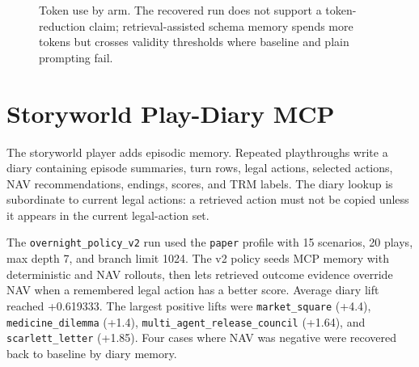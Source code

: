 \documentclass[11pt]{article}
\begin{document}
\begin{figure}[t]
\centering
{}
\caption{Token use by arm. The recovered run does not support a token-reduction claim; retrieval-assisted schema memory spends more tokens but crosses validity thresholds where baseline and plain prompting fail.}
\label{fig:tokens}
\end{figure}

\section{Storyworld Play-Diary MCP}

The storyworld player adds episodic memory. Repeated playthroughs write a diary containing episode summaries, turn rows, legal actions, selected actions, NAV recommendations, endings, scores, and TRM labels. The diary lookup is subordinate to current legal actions: a retrieved action must not be copied unless it appears in the current legal-action set.

The \texttt{overnight\_policy\_v2} run used the \texttt{paper} profile with 15 scenarios, 20 plays, max depth 7, and branch limit 1024. The v2 policy seeds MCP memory with deterministic and NAV rollouts, then lets retrieved outcome evidence override NAV when a remembered legal action has a better score. Average diary lift reached +0.619333. The largest positive lifts were \texttt{market\_square} (+4.4), \texttt{medicine\_dilemma} (+1.4), \texttt{multi\_agent\_release\_council} (+1.64), and \texttt{scarlett\_letter} (+1.85). Four cases where NAV was negative were recovered back to baseline by diary memory.
\end{document}
